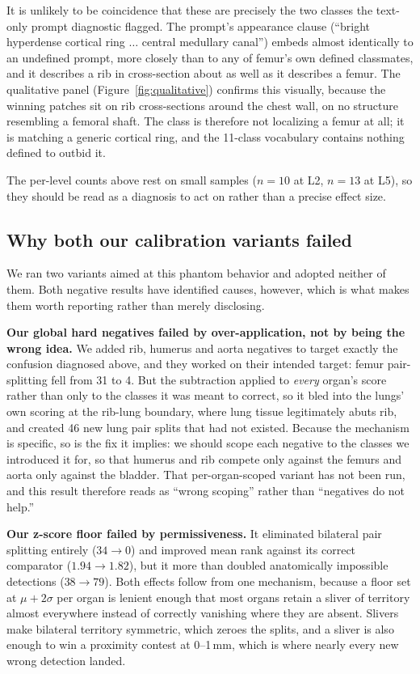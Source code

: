 It is unlikely to be coincidence that these are precisely the two classes the
text-only prompt diagnostic flagged. The  prompt's appearance clause
(``bright hyperdense cortical ring $\ldots$ central medullary canal'') embeds
almost identically to an undefined  prompt, more closely than to
any of femur's own defined classmates, and it describes a rib in cross-section
about as well as it describes a femur. The qualitative panel
(Figure~\ref{fig:qualitative}) confirms this visually, because the winning
 patches sit on rib cross-sections around the chest wall, on no
structure resembling a femoral shaft. The class is therefore not localizing a
femur at all; it is matching a generic cortical ring, and the 11-class
vocabulary contains nothing defined to outbid it.

The per-level counts above rest on small samples ($n=10$ at L2, $n=13$ at L5),
so they should be read as a diagnosis to act on rather than a precise effect
size.

\subsection{Why both our calibration variants failed}

We ran two variants aimed at this phantom behavior and adopted neither of them.
Both negative results have identified causes, however, which is what makes them
worth reporting rather than merely disclosing.

\textbf{Our global hard negatives failed by over-application, not by being the
wrong idea.} We added rib, humerus and aorta negatives to target exactly the
confusion diagnosed above, and they worked on their intended target: femur
pair-splitting fell from 31 to 4. But the subtraction applied to
\emph{every} organ's score rather than only to the classes it was meant to
correct, so it bled into the lungs' own scoring at the rib-lung boundary, where
lung tissue legitimately abuts rib, and created 46 new lung pair splits that had
not existed. Because the mechanism is specific, so is the fix it implies: we
should scope each negative to the classes we introduced it for, so that humerus
and rib compete only against the femurs and aorta only against the bladder. That
per-organ-scoped variant has not been run, and this result therefore reads as
``wrong scoping'' rather than ``negatives do not help.''

\textbf{Our z-score floor failed by permissiveness.} It eliminated bilateral
pair splitting entirely ($34 \to 0$) and improved mean rank against its correct
comparator ($1.94 \to 1.82$), but it more than doubled anatomically impossible
detections ($38 \to 79$). Both effects follow from one mechanism, because a
floor set at $\mu + 2\sigma$ per organ is lenient enough that most organs retain
a sliver of territory almost everywhere instead of correctly vanishing where
they are absent. Slivers make bilateral territory symmetric, which zeroes the
splits, and a sliver is also enough to win a proximity contest at 0--1\,mm,
which is where nearly every new wrong detection landed.

